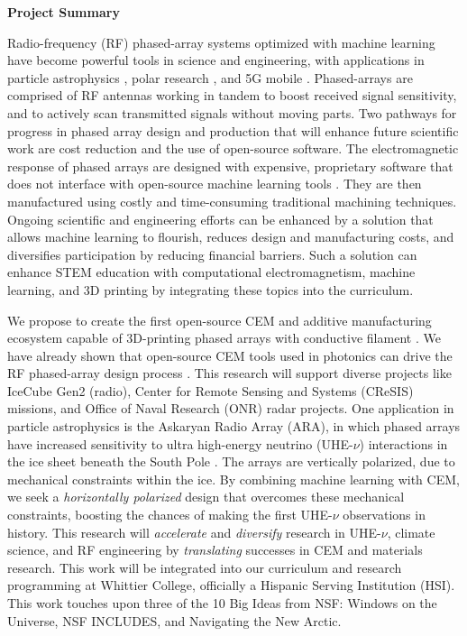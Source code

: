 \documentclass[10pt]{amsart}
\theoremstyle{definition}
\numberwithin{equation}{section}
\begin{document}
\centerline{\bf \Large Project Summary}
\setcounter{section}{0}
\linespacing 

Radio-frequency (RF) phased-array systems optimized with machine learning have become powerful tools in science and engineering, with applications in particle astrophysics \cite{Vieregg_2016,AVVA201746,electronics10040415,rno}, polar research \cite{arnold_2020,9670670}, and 5G mobile \cite{5G_review_paper}.  Phased-arrays are comprised of RF antennas working in tandem to boost received signal sensitivity, and to actively scan transmitted signals without moving parts.  Two pathways for progress in phased array design and production that will enhance future scientific work are cost reduction and the use of open-source software.  The electromagnetic response of phased arrays are designed with expensive, proprietary software that does not interface with open-source machine learning tools \cite{10.3390/electronics8121506}.  They are then manufactured using costly and time-consuming traditional machining techniques.  Ongoing scientific and engineering efforts can be enhanced by a solution that allows machine learning to flourish, reduces design and manufacturing costs, and diversifies participation by reducing financial barriers.  Such a solution can enhance STEM education with computational electromagnetism, machine learning, and 3D printing by integrating these topics into the curriculum.

We propose to create the first open-source CEM and additive manufacturing ecosystem capable of 3D-printing phased arrays with conductive filament \cite{10.3390/electronics8121506, yurduseven,8786183}.  We have already shown that open-source CEM tools used in photonics can drive the RF phased-array design process \cite{electronics10040415,meepcon2022,10.1016/j.cpc.2009.11.008}.  This research will support diverse projects like IceCube Gen2 (radio), Center for Remote Sensing and Systems (CReSIS) missions, and Office of Naval Research (ONR) radar projects.  One application in particle astrophysics is the Askaryan Radio Array (ARA), in which phased arrays have increased sensitivity to ultra high-energy neutrino (UHE-$\nu$) interactions in the ice sheet beneath the South Pole \cite{PhysRevD.105.122006}.  The arrays are vertically polarized, due to mechanical constraints within the ice.  By combining machine learning with CEM, we seek a \textit{horizontally polarized} design that overcomes these mechanical constraints, boosting the chances of making the first UHE-$\nu$ observations in history.  This research will \textit{accelerate} and \textit{diversify} research in UHE-$\nu$, climate science, and RF engineering by \textit{translating} successes in CEM and materials research.  This work will be integrated into our curriculum and research programming at Whittier College, officially a Hispanic Serving Institution (HSI).  This work touches upon three of the 10 Big Ideas from NSF: Windows on the Universe, NSF INCLUDES, and Navigating the New Arctic.
\end{document}

